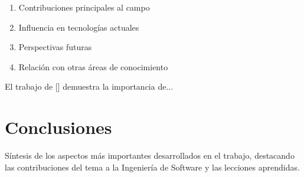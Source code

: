\documentclass[12pt,a4paper]{article}
\begin{document}
\begin{enumerate}
    \item Contribuciones principales al campo
    \item Influencia en tecnologías actuales
    \item Perspectivas futuras
    \item Relación con otras áreas de conocimiento
\end{enumerate}

El trabajo de [] demuestra la importancia de...

\section{Conclusiones}

Síntesis de los aspectos más importantes desarrollados en el trabajo, destacando las contribuciones del tema a la Ingeniería de Software y las lecciones aprendidas.

\newpage


\end{document}
